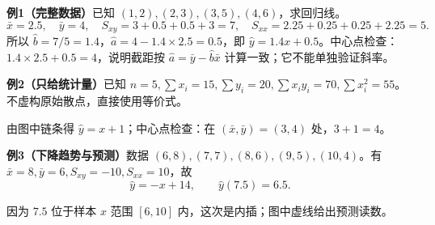 \clearpage
\begin{examplebox}
\textbf{例1（完整数据）}\quad 已知 $(1,2),(2,3),(3,5),(4,6)$，求回归线。
\[
 \bar x=2.5,\quad\bar y=4,\quad
 S_{xy}=3+0.5+0.5+3=7,\quad S_{xx}=2.25+0.25+0.25+2.25=5.
\]
所以 $\hat b=7/5=1.4$，$\hat a=4-1.4\times2.5=0.5$，即 $\hat y=1.4x+0.5$。中心点检查：$1.4\times2.5+0.5=4$，说明截距按 $\hat a=\bar y-\hat b\bar x$ 计算一致；它不能单独验证斜率。


\clearpage
\textbf{例2（只给统计量）}\quad 已知 $n=5,\sum x_i=15,\sum y_i=20,\sum x_iy_i=70,\sum x_i^2=55$。不虚构原始散点，直接使用等价式。

由图中链条得 $\hat y=x+1$；中心点检查：在 $(\bar x,\bar y)=(3,4)$ 处，$3+1=4$。

\clearpage
\textbf{例3（下降趋势与预测）}\quad 数据 $(6,8),(7,7),(8,6),(9,5),(10,4)$。有 $\bar x=8,\bar y=6,S_{xy}=-10,S_{xx}=10$，故
\[
 \hat y=-x+14,\qquad \hat y(7.5)=6.5.
\]

因为 $7.5$ 位于样本 $x$ 范围 $[6,10]$ 内，这次是内插；图中虚线给出预测读数。
\end{examplebox}
